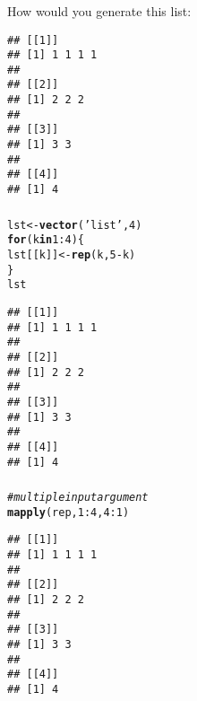 \documentclass[12pt]{beamer}\usepackage[]{graphicx}\usepackage[]{color}
\makeatletter
\newcommand{\hlnum}[1]{\textcolor[rgb]{0.686,0.059,0.569}{#1}}%
\newcommand{\hlstr}[1]{\textcolor[rgb]{0.192,0.494,0.8}{#1}}%
\newcommand{\hlcom}[1]{\textcolor[rgb]{0.678,0.584,0.686}{\textit{#1}}}%
\newcommand{\hlopt}[1]{\textcolor[rgb]{0,0,0}{#1}}%
\newcommand{\hlstd}[1]{\textcolor[rgb]{0.345,0.345,0.345}{#1}}%
\newcommand{\hlkwa}[1]{\textcolor[rgb]{0.161,0.373,0.58}{\textbf{#1}}}%
\newcommand{\hlkwb}[1]{\textcolor[rgb]{0.69,0.353,0.396}{#1}}%
\newcommand{\hlkwd}[1]{\textcolor[rgb]{0.737,0.353,0.396}{\textbf{#1}}}%
\newenvironment{kframe}{%
 \def\at@end@of@kframe{}%
 \ifinner\ifhmode%
  \def\at@end@of@kframe{\end{minipage}}%
  \begin{minipage}{\columnwidth}%
 \fi\fi%
 \def\FrameCommand##1{\hskip\@totalleftmargin \hskip-\fboxsep
 \colorbox{shadecolor}{##1}\hskip-\fboxsep
     \hskip-\linewidth \hskip-\@totalleftmargin \hskip\columnwidth}%
 \MakeFramed {\advance\hsize-\width
   \@totalleftmargin\z@ \linewidth\hsize
   \@setminipage}}%
 {\par\unskip\endMakeFramed%
 \at@end@of@kframe}
\newenvironment{knitrout}{}{} %
\makeatother
\begin{document}

\begin{frame}[fragile]
\frametitle{}

How would you generate this list:
\begin{knitrout}\footnotesize
{}\color{fgcolor}\begin{kframe}
\begin{verbatim}
## [[1]]
## [1] 1 1 1 1
## 
## [[2]]
## [1] 2 2 2
## 
## [[3]]
## [1] 3 3
## 
## [[4]]
## [1] 4
\end{verbatim}
\end{kframe}
\end{knitrout}

\end{frame}


\begin{frame}[fragile]
\frametitle{}

\begin{knitrout}\footnotesize
{}\color{fgcolor}\begin{kframe}
\begin{alltt}
\hlstd{lst} \hlkwb{<-} \hlkwd{vector}\hlstd{(}\hlstr{'list'}\hlstd{,} \hlnum{4}\hlstd{)}
\hlkwa{for} \hlstd{(k} \hlkwa{in} \hlnum{1}\hlopt{:}\hlnum{4}\hlstd{) \{}
  \hlstd{lst[[k]]} \hlkwb{<-} \hlkwd{rep}\hlstd{(k,} \hlnum{5}\hlopt{-}\hlstd{k)}
\hlstd{\}}
\hlstd{lst}
\end{alltt}
\begin{verbatim}
## [[1]]
## [1] 1 1 1 1
## 
## [[2]]
## [1] 2 2 2
## 
## [[3]]
## [1] 3 3
## 
## [[4]]
## [1] 4
\end{verbatim}
\end{kframe}
\end{knitrout}

\end{frame}


\begin{frame}[fragile]
\frametitle{}

\begin{knitrout}\footnotesize
{}\color{fgcolor}\begin{kframe}
\begin{alltt}
\hlcom{# multiple input argument}
\hlkwd{mapply}\hlstd{(rep,} \hlnum{1}\hlopt{:}\hlnum{4}\hlstd{,} \hlnum{4}\hlopt{:}\hlnum{1}\hlstd{)}
\end{alltt}
\begin{verbatim}
## [[1]]
## [1] 1 1 1 1
## 
## [[2]]
## [1] 2 2 2
## 
## [[3]]
## [1] 3 3
## 
## [[4]]
## [1] 4
\end{verbatim}
\end{kframe}
\end{knitrout}

\end{frame}
\end{document}
